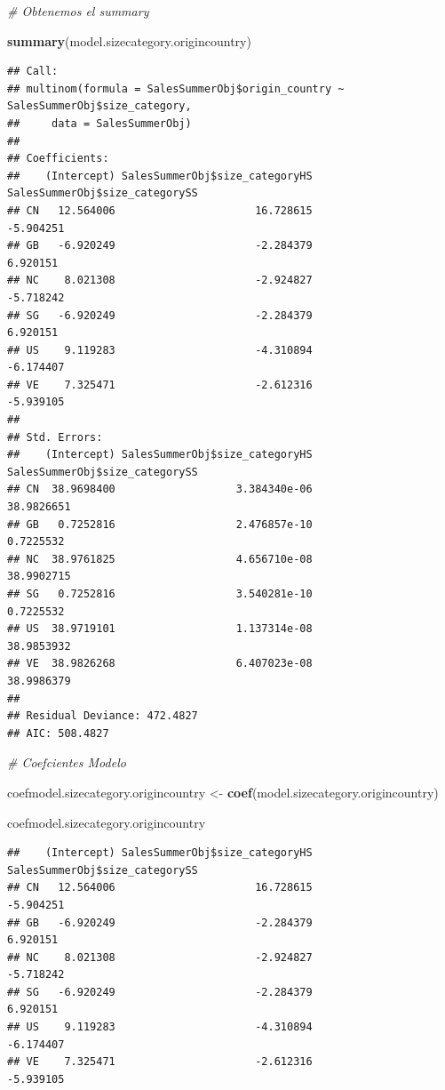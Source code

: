 \documentclass[
]{article}
\newenvironment{Shaded}{\begin{snugshade}}{\end{snugshade}}
\newcommand{\CommentTok}[1]{\textcolor[rgb]{0.56,0.35,0.01}{\textit{#1}}}
\newcommand{\KeywordTok}[1]{\textcolor[rgb]{0.13,0.29,0.53}{\textbf{#1}}}
\newcommand{\NormalTok}[1]{#1}
\newcommand{\StringTok}[1]{\textcolor[rgb]{0.31,0.60,0.02}{#1}}
\begin{document}
\begin{Shaded}
\begin{Highlighting}[]
\CommentTok{# Obtenemos el summary}

\KeywordTok{summary}\NormalTok{(model.sizecategory.origincountry)}
\end{Highlighting}
\end{Shaded}

\begin{verbatim}
## Call:
## multinom(formula = SalesSummerObj$origin_country ~ SalesSummerObj$size_category, 
##     data = SalesSummerObj)
## 
## Coefficients:
##    (Intercept) SalesSummerObj$size_categoryHS SalesSummerObj$size_categorySS
## CN   12.564006                      16.728615                      -5.904251
## GB   -6.920249                      -2.284379                       6.920151
## NC    8.021308                      -2.924827                      -5.718242
## SG   -6.920249                      -2.284379                       6.920151
## US    9.119283                      -4.310894                      -6.174407
## VE    7.325471                      -2.612316                      -5.939105
## 
## Std. Errors:
##    (Intercept) SalesSummerObj$size_categoryHS SalesSummerObj$size_categorySS
## CN  38.9698400                   3.384340e-06                     38.9826651
## GB   0.7252816                   2.476857e-10                      0.7225532
## NC  38.9761825                   4.656710e-08                     38.9902715
## SG   0.7252816                   3.540281e-10                      0.7225532
## US  38.9719101                   1.137314e-08                     38.9853932
## VE  38.9826268                   6.407023e-08                     38.9986379
## 
## Residual Deviance: 472.4827 
## AIC: 508.4827
\end{verbatim}

\begin{Shaded}
\begin{Highlighting}[]
\CommentTok{# Coefcientes Modelo }

\NormalTok{coefmodel.sizecategory.origincountry <-}\StringTok{ }\KeywordTok{coef}\NormalTok{(model.sizecategory.origincountry)}

\NormalTok{coefmodel.sizecategory.origincountry}
\end{Highlighting}
\end{Shaded}

\begin{verbatim}
##    (Intercept) SalesSummerObj$size_categoryHS SalesSummerObj$size_categorySS
## CN   12.564006                      16.728615                      -5.904251
## GB   -6.920249                      -2.284379                       6.920151
## NC    8.021308                      -2.924827                      -5.718242
## SG   -6.920249                      -2.284379                       6.920151
## US    9.119283                      -4.310894                      -6.174407
## VE    7.325471                      -2.612316                      -5.939105
\end{verbatim}
\end{document}
